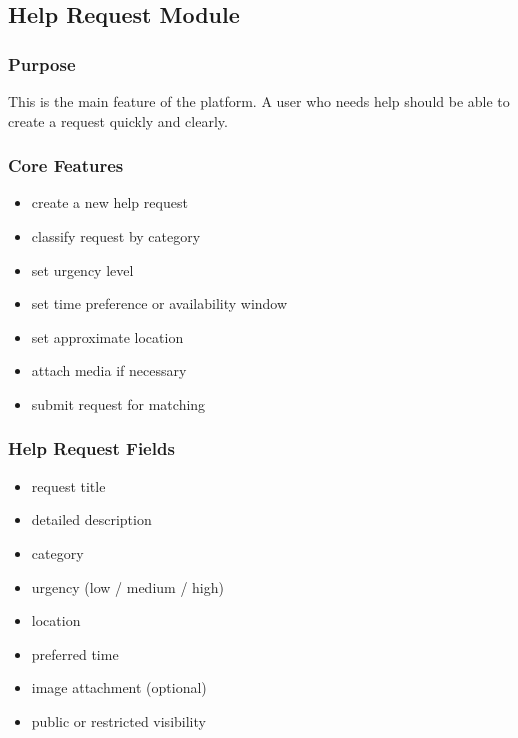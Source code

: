 \documentclass[11pt]{article}
\begin{document}
\subsection{Help Request Module}

\subsubsection{Purpose}
This is the main feature of the platform. A user who needs help should be able to create a request quickly and clearly.

\subsubsection{Core Features}
\begin{itemize}[leftmargin=1.5em]
    \item create a new help request
    \item classify request by category
    \item set urgency level
    \item set time preference or availability window
    \item set approximate location
    \item attach media if necessary
    \item submit request for matching
\end{itemize}

\subsubsection{Help Request Fields}
\begin{itemize}[leftmargin=1.5em]
    \item request title
    \item detailed description
    \item category
    \item urgency (low / medium / high)
    \item location
    \item preferred time
    \item image attachment (optional)
    \item public or restricted visibility
\end{itemize}
\end{document}
